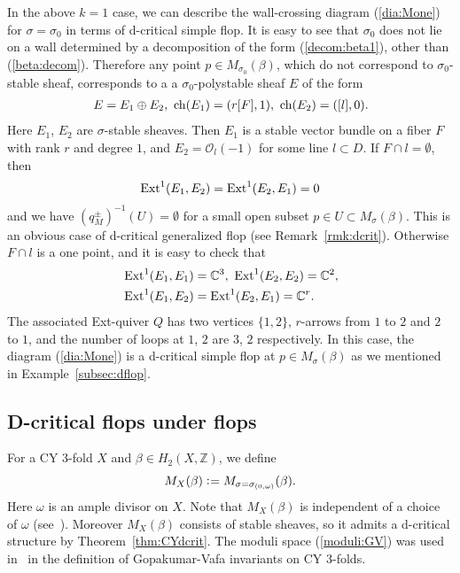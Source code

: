 \documentclass[11pt]{amsart}
\theoremstyle{plain}
\theoremstyle{definition}
\theoremstyle{remark}
\newcommand{\oO}{\mathcal{O}}
\newcommand{\ch}{\mathop{\rm ch}\nolimits}
\newcommand{\Ext}{\mathop{\rm Ext}\nolimits}
\begin{document}
In the above $k=1$ case, we can describe 
the wall-crossing diagram (\ref{dia:Mone}) 
for $\sigma=\sigma_0$
in terms of d-critical simple flop. 
It is easy to see that 
$\sigma_0$ does not lie 
on a wall determined by a 
decomposition of the form (\ref{decom:beta1}), 
other than (\ref{beta:decom}). 
Therefore any point $p\in M_{\sigma_0}(\beta)$,
which do not correspond to $\sigma_0$-stable sheaf,
corresponds to a 
a $\sigma_0$-polystable 
sheaf $E$ of the form
\begin{align*}
E=E_1 \oplus E_2, \ 
\ch(E_1)=(r[F], 1), \ 
\ch(E_2)=([l], 0).
\end{align*}
Here $E_1$, $E_2$ are $\sigma$-stable 
sheaves. 
Then $E_1$ is a 
stable vector bundle on 
a fiber $F$ with rank $r$ and degree $1$, 
and $E_2=\oO_l(-1)$
for some line $l \subset D$. 
If $F \cap l=\emptyset$, then 
\begin{align*}
\Ext^1(E_1, E_2)=\Ext^1(E_2, E_1)=0
\end{align*}
and 
we have $(q_M^{\pm})^{-1}(U)=\emptyset$
for a small open subset $p \in U \subset M_{\sigma}(\beta)$. 
This is an obvious case of d-critical generalized flop 
(see Remark~\ref{rmk:dcrit}). 
Otherwise
$F \cap l$ is a one point, and  
it is easy to check that
\begin{align*}
&\Ext^1(E_1, E_1)=\mathbb{C}^3, \ 
\Ext^1(E_2, E_2)=\mathbb{C}^2, \\ 
&\Ext^1(E_1, E_2)=\Ext^1(E_2, E_1)=\mathbb{C}^r. 
\end{align*}
The associated Ext-quiver $Q$ 
has two vertices $\{1, 2\}$, 
$r$-arrows from $1$ to $2$ and $2$ to $1$, 
and the number of 
loops at $1$, $2$ are $3$, $2$ respectively. 
In this case, 
the diagram (\ref{dia:Mone}) 
is a d-critical simple flop at $p \in M_{\sigma}(\beta)$ 
as we mentioned 
in Example~\ref{subsec:dflop}. 


\subsection{D-critical flops under flops}\label{subsec:FF}
For a CY 3-fold $X$ and $\beta \in H_2(X, \mathbb{Z})$, we define
\begin{align}\label{moduli:GV}
M_X(\beta) \cneq M_{\sigma=\sigma_{(0, \omega)}}(\beta).
\end{align}
Here $\omega$ is an ample divisor on $X$. 
Note that $M_X(\beta)$ is independent of a choice of 
$\omega$ (see~\cite[Remark~3.2]{MT}).
Moreover $M_X(\beta)$ consists of stable sheaves, 
so it admits a d-critical structure
by Theorem~\ref{thm:CYdcrit}.
The moduli space (\ref{moduli:GV}) was used in~\cite{MT}
in the definition of Gopakumar-Vafa invariants on 
CY 3-folds.  
\end{document}
